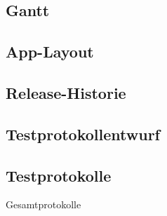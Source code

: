 \newpage



\subsection{Gantt}
\label{subsec:Gantt}
\begin{landscape}
	
\end{landscape}

\subsection{App-Layout}
\label{subsec:App-Layout}
	
	
\subsection{Release-Historie}
\label{subsec:Release-Historie}
		
	
\subsection{Testprotokollentwurf}
\label{subsec:Testprotokollentwurf}
	
	





	
	
	
	
	


	
\subsection{Testprotokolle}
\label{subsec:Testprotokolle}

\Large{Gesamtprotokolle}


	

